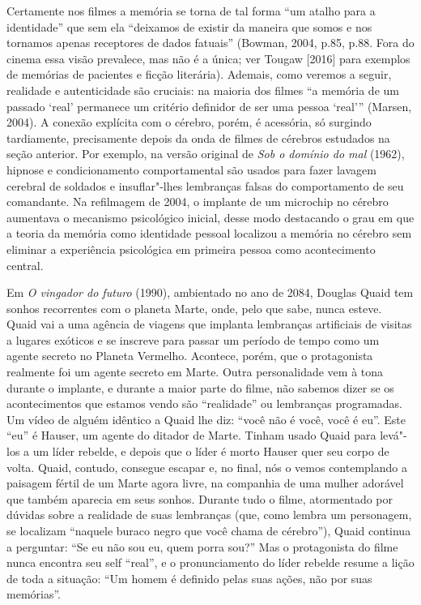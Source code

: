 Certamente nos filmes a memória se torna de tal forma ``um atalho para a
identidade'' que sem ela ``deixamos de existir da maneira que somos e
nos tornamos apenas receptores de dados fatuais'' (Bowman, 2004, p.85,
p.88. Fora do cinema essa visão prevalece, mas não é a única; ver Tougaw
{[}2016{]} para exemplos de memórias de pacientes e ficção literária).
Ademais, como veremos a seguir, realidade e autenticidade são cruciais:
na maioria dos filmes ``a memória de um passado `real' permanece um
critério definidor de ser uma pessoa `real''' (Marsen, 2004). A conexão
explícita com o cérebro, porém, é acessória, só surgindo tardiamente,
precisamente depois da onda de filmes de cérebros estudados na seção
anterior. Por exemplo, na versão original de \emph{Sob o domínio do mal}
(1962), hipnose e condicionamento comportamental são usados para fazer
lavagem cerebral de soldados e insuflar"-lhes lembranças falsas do
comportamento de seu comandante. Na refilmagem de 2004, o implante de um
microchip no cérebro aumentava o mecanismo psicológico inicial, desse
modo destacando o grau em que a teoria da memória como identidade
pessoal localizou a memória no cérebro sem eliminar a experiência
psicológica em primeira pessoa como acontecimento central.

Em \emph{O vingador do futuro} (1990), ambientado no ano de 2084,
Douglas Quaid tem sonhos recorrentes com o planeta Marte, onde, pelo que
sabe, nunca esteve. Quaid vai a uma agência de viagens que implanta
lembranças artificiais de visitas a lugares exóticos e se inscreve para
passar um período de tempo como um agente secreto no Planeta Vermelho.
Acontece, porém, que o protagonista realmente foi um agente secreto em
Marte. Outra personalidade vem à tona durante o implante, e durante a
maior parte do filme, não sabemos dizer se os acontecimentos que estamos
vendo são ``realidade'' ou lembranças programadas. Um vídeo de alguém
idêntico a Quaid lhe diz: ``você não é você, você é eu''. Este ``eu'' é
Hauser, um agente do ditador de Marte. Tinham usado Quaid para levá"-los
a um líder rebelde, e depois que o líder é morto Hauser quer seu corpo
de volta. Quaid, contudo, consegue escapar e, no final, nós o vemos
contemplando a paisagem fértil de um Marte agora livre, na companhia de
uma mulher adorável que também aparecia em seus sonhos. Durante tudo o
filme, atormentado por dúvidas sobre a realidade de suas lembranças
(que, como lembra um personagem, se localizam ``naquele buraco negro que
você chama de cérebro''), Quaid continua a perguntar: ``Se eu não sou
eu, quem porra sou?'' Mas o protagonista do filme nunca encontra seu
self ``real'', e o pronunciamento do líder rebelde resume a lição de
toda a situação: ``Um homem é definido pelas suas ações, não por suas
memórias''.

